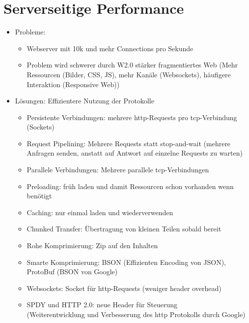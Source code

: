 \documentclass{article} %
\begin{document}
	
\section{Serverseitige Performance}
	\begin{itemize}
		\item Probleme:
		\begin{itemize}
			\item Webserver mit 10k und mehr Connections pro Sekunde
			\item Problem wird schwerer durch W2.0 stärker fragmentiertes Web (Mehr Ressourcen (Bilder, CSS, JS), mehr Kanäle (Websockets), häufigere Interaktion (Responsive Web))
		\end{itemize}
		\item Lösungen: Effizientere Nutzung der Protokolle
		\begin{itemize}
			\item Persistente Verbindungen: mehrere http-Requests pro tcp-Verbindung (Sockets)
			\item Request Pipelining: Mehrere Requests statt stop-and-wait (mehrere Anfragen senden, anstatt auf Antwort auf einzelne Requests zu warten)
			\item Parallele Verbindungen: Mehrere parallele tcp-Verbindungen
			\item Preloading: früh laden und damit Ressourcen schon vorhanden wenn benötigt
			\item Caching: nur einmal laden und wiederverwenden
			\item Chunked Transfer: Übertragung von kleinen Teilen sobald bereit
			\item Rohe Komprimierung: Zip auf den Inhalten
			\item Smarte Komprimierung: BSON (Effizienten Encoding von JSON), ProtoBuf (BSON von Google)
			\item Websockets: Socket für http-Requests (weniger header overhead)
			\item SPDY und HTTP 2.0: neue Header für Steuerung\\
			(Weiterentwicklung und Verbesserung des http Protokolls durch Google)
		\end{itemize}
	\end{itemize}
\end{document}
